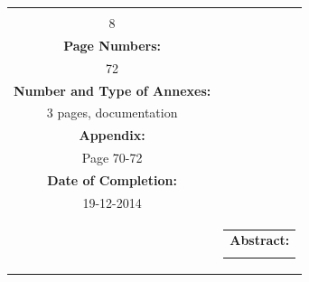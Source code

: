 \begin{titlepage}
\begin{nopagebreak}
{\begin{tabular}{cc}
{\begin{description}
                        \item {\bf Copies:}\\ 8\\
                        \item {\bf Page Numbers:}\\ 72\\
                        \item {\bf Number and Type of Annexes:}\\ 3 pages, documentation\\
                        \item {\bf Appendix:}\\ Page 70-72\\
                        \item {\bf Date of Completion:}\\ 19-12-2014\\
                    \end{description}
                    \vfill
                } &
                \parbox{7cm}{
                    \vspace{.15cm}
                    \hfill 
                    \begin{tabular}{l}
                        {\bf Abstract:}\bigskip \\
                        \fbox{
                            \parbox{6.5cm}{\smallskip
                                {\vfill{\small 
                                \smallskip}}
                            }
                        }
                    \end{tabular}
                }
            \end{tabular}
        }\\
        \\
    \end{nopagebreak}
\end{titlepage}
